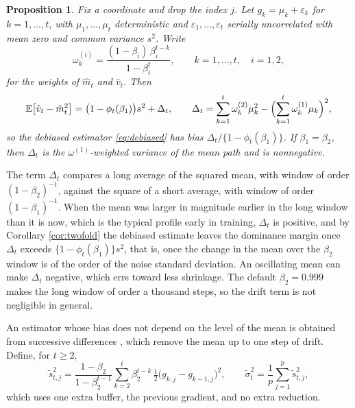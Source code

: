 \documentclass[a4paper,fleqn]{cas-sc}
\theoremstyle{plain}
\newtheorem{proposition}[theorem]{Proposition}
\theoremstyle{definition}
\theoremstyle{remark}
\newcommand{\E}{\mathbb{E}}
\begin{document}
\begin{proposition}
\label{prop:drift}
Fix a coordinate and drop the index $j$. Let $g_k=\mu_k+\varepsilon_k$ for $k=1,\dots,t$, with $\mu_1,\dots,\mu_t$ deterministic and $\varepsilon_1,\dots,\varepsilon_t$ serially uncorrelated with mean zero and common variance $s^2$. Write
\begin{equation}
\omega^{(i)}_{k}=\frac{(1-\beta_i)\,\beta_i^{t-k}}{1-\beta_i^{t}},
\qquad k=1,\dots,t,\quad i=1,2,
\end{equation}
for the weights of $\hat m_t$ and $\hat v_t$. Then
\begin{equation}
\label{eq:drift_bias}
\E\bigl[\hat v_t-\hat m^2_t\bigr]=\bigl(1-\phi_t(\beta_1)\bigr)s^2+\Delta_t,
\qquad
\Delta_t=\sum_{k=1}^{t}\omega^{(2)}_k\mu^2_k-\Bigl(\sum_{k=1}^{t}\omega^{(1)}_k\mu_k\Bigr)^{2},
\end{equation}
so the debiased estimator \eqref{eq:debiased} has bias $\Delta_t/\{1-\phi_t(\beta_1)\}$. If $\beta_1=\beta_2$, then $\Delta_t$ is the $\omega^{(1)}$-weighted variance of the mean path and is nonnegative.
\end{proposition}

The term $\Delta_t$ compares a long average of the squared mean, with window of order $(1-\beta_2)^{-1}$, against the square of a short average, with window of order $(1-\beta_1)^{-1}$. When the mean was larger in magnitude earlier in the long window than it is now, which is the typical profile early in training, $\Delta_t$ is positive, and by Corollary \ref{cor:twofold} the debiased estimate leaves the dominance margin once $\Delta_t$ exceeds $\{1-\phi_t(\beta_1)\}s^2$, that is, once the change in the mean over the $\beta_2$ window is of the order of the noise standard deviation. An oscillating mean can make $\Delta_t$ negative, which errs toward less shrinkage. The default $\beta_2=0.999$ makes the long window of order a thousand steps, so the drift term is not negligible in general.

An estimator whose bias does not depend on the level of the mean is obtained from successive differences \citep{vonneumann1941}, which remove the mean up to one step of drift. Define, for $t\ge2$,
\begin{equation}
\label{eq:diff_estimator}
\tilde s^2_{t,j}=\frac{1-\beta_2}{1-\beta_2^{t-1}}\sum_{k=2}^{t}\beta_2^{t-k}\,\tfrac12\bigl(g_{k,j}-g_{k-1,j}\bigr)^2 ,
\qquad
\tilde\sigma^2_t=\frac1p\sum_{j=1}^{p}\tilde s^2_{t,j},
\end{equation}
which uses one extra buffer, the previous gradient, and no extra reduction.
\end{document}
